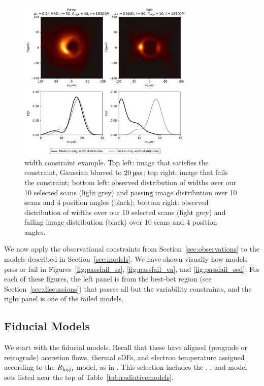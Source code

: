 \begin{figure}
  \centering
  \includegraphics[width=0.75\textwidth]{figures/mring_width_example.pdf}
  \caption{\Mring width constraint example.
    Top left: image that satisfies the constraint, Gaussian blurred to $20\uas$;
    top right: image that fails the constraint;
    bottom left: observed distribution of \mring widths over our 10 selected scans (light grey) and passing image distribution over 10 scans and 4 position angles (black);
    bottom right: observed distribution of \mring widths over our 10 selected scans (light grey) and failing image distribution (black) over 10 scans and 4 position angles.}
  \label{fig:mring_width_example}
\end{figure}

We now apply the observational constraints from Section~\ref{sec:observations} to the models described in Section~\ref{sec:models}.
We have shown visually how models pass or fail in Figures~\ref{fig:passfail_sz}, \ref{fig:passfail_va}, and \ref{fig:passfail_sed}.
For each of these figures, the left panel is from the best-bet region (see Section~\ref{sec:discussions}) that passes all but the variability constraints, and the right panel is one of the failed models.

\subsection{Fiducial Models}\label{subsec:thermal}

We start with the fiducial models.
Recall that these have aligned (prograde or retrograde) accretion flows, thermal eDFs, and electron temperature assigned according to the $R_\mathrm{high}$ model, as in .
This selection includes the \kharma, \bhac, and \hamr model sets listed near the top of Table~\ref{tab:radiativemodels}.


